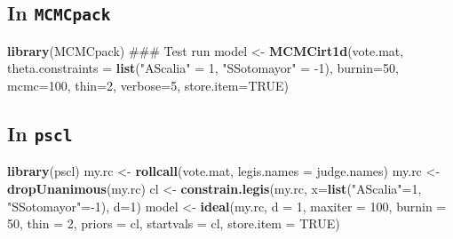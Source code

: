 \documentclass[12pt,twoside]{article}
\newenvironment{Shaded}{}{}
\newcommand{\KeywordTok}[1]{\textcolor[rgb]{0.00,0.44,0.13}{\textbf{{#1}}}}
\newcommand{\DataTypeTok}[1]{\textcolor[rgb]{0.56,0.13,0.00}{{#1}}}
\newcommand{\DecValTok}[1]{\textcolor[rgb]{0.25,0.63,0.44}{{#1}}}
\newcommand{\StringTok}[1]{\textcolor[rgb]{0.25,0.44,0.63}{{#1}}}
\newcommand{\OtherTok}[1]{\textcolor[rgb]{0.00,0.44,0.13}{{#1}}}
\newcommand{\NormalTok}[1]{{#1}}
\begin{document}
\subsection{\texorpdfstring{In
\texttt{MCMCpack}}{In MCMCpack}}\label{in-mcmcpack}

\footnotesize 

\begin{Shaded}
\begin{Highlighting}[]
\KeywordTok{library}\NormalTok{(MCMCpack)}
\NormalTok{### Test run}
\NormalTok{model <-}\StringTok{ }\KeywordTok{MCMCirt1d}\NormalTok{(vote.mat,}
                  \DataTypeTok{theta.constraints =} \KeywordTok{list}\NormalTok{(}\StringTok{"AScalia"} \NormalTok{=}\StringTok{ }\DecValTok{1}\NormalTok{,}
                                           \StringTok{"SSotomayor"} \NormalTok{=}\StringTok{ }\NormalTok{-}\DecValTok{1}\NormalTok{),}
                  \DataTypeTok{burnin=}\DecValTok{50}\NormalTok{,}
                  \DataTypeTok{mcmc=}\DecValTok{100}\NormalTok{,}
                  \DataTypeTok{thin=}\DecValTok{2}\NormalTok{,}
                  \DataTypeTok{verbose=}\DecValTok{5}\NormalTok{,}
                        \DataTypeTok{store.item=}\OtherTok{TRUE}\NormalTok{)}
\end{Highlighting}
\end{Shaded}

\subsection{\texorpdfstring{In \texttt{pscl}}{In pscl}}\label{in-pscl}

\footnotesize 

\begin{Shaded}
\begin{Highlighting}[]
\KeywordTok{library}\NormalTok{(pscl)}
\NormalTok{my.rc <-}\StringTok{ }\KeywordTok{rollcall}\NormalTok{(vote.mat,}
                  \DataTypeTok{legis.names =} \NormalTok{judge.names)}
\NormalTok{my.rc <-}\StringTok{ }\KeywordTok{dropUnanimous}\NormalTok{(my.rc)}
\NormalTok{cl <-}\StringTok{ }\KeywordTok{constrain.legis}\NormalTok{(my.rc,}
                            \DataTypeTok{x=}\KeywordTok{list}\NormalTok{(}\StringTok{"AScalia"}\NormalTok{=}\DecValTok{1}\NormalTok{,}
                              \StringTok{"SSotomayor"}\NormalTok{=-}\DecValTok{1}\NormalTok{),}
                            \DataTypeTok{d=}\DecValTok{1}\NormalTok{)}
\NormalTok{model <-}\StringTok{ }\KeywordTok{ideal}\NormalTok{(my.rc, }\DataTypeTok{d =} \DecValTok{1}\NormalTok{,}
               \DataTypeTok{maxiter =} \DecValTok{100}\NormalTok{,}
               \DataTypeTok{burnin =} \DecValTok{50}\NormalTok{,}
               \DataTypeTok{thin =} \DecValTok{2}\NormalTok{,}
               \DataTypeTok{priors =} \NormalTok{cl,}
               \DataTypeTok{startvals =} \NormalTok{cl,}
               \DataTypeTok{store.item =} \OtherTok{TRUE}\NormalTok{)               }
\end{Highlighting}
\end{Shaded}
\end{document}

